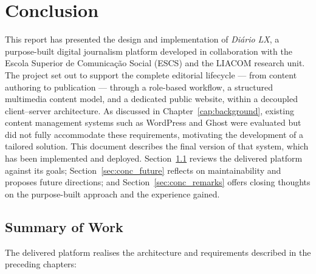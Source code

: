 %
%
\chapter{Conclusion} \label{cap:conclusion}

This report has presented the design and implementation of \textit{Diário LX}, a
purpose-built digital journalism platform developed in collaboration with the Escola
Superior de Comunicação Social (ESCS) and the LIACOM research unit. The project set out
to support the complete editorial lifecycle --- from content authoring to publication
--- through a role-based workflow, a structured multimedia content model, and a
dedicated public website, within a decoupled client--server architecture. As discussed
in Chapter~\ref{cap:background}, existing content management systems such as WordPress
and Ghost were evaluated but did not fully accommodate these requirements, motivating
the development of a tailored solution. This document describes the final version of
that system, which has been implemented and deployed. Section~\ref{sec:conc_summary} reviews
the delivered platform against its goals; Section~\ref{sec:conc_future} reflects on maintainability and
proposes future directions; and Section~\ref{sec:conc_remarks} offers closing thoughts on the
purpose-built approach and the experience gained.

\section{Summary of Work} \label{sec:conc_summary}

The delivered platform realises the architecture and requirements described in the
preceding chapters:

